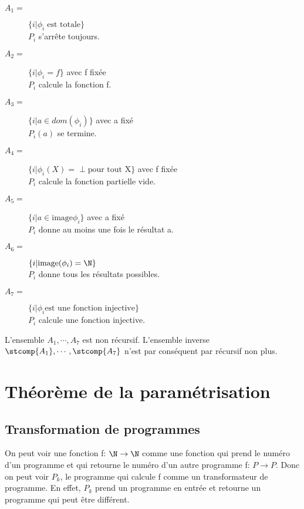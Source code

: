 \begin{description}
	\item[$A_1 =$] $\{i| \phi_i \; \text{est totale}\}$ \\
	 				$P_i$ s'arrête toujours.
	\item[$A_2 =$] $\{i| \phi_i = f\}$ avec f fixée \\
					$P_i$ calcule la fonction f.
	\item[$A_3 =$] $\{i| a \in dom(\phi_i)\}$ avec a fixé \\
					$P_i(a)$ se termine.
	\item[$A_4 =$] $\{i| \phi_i(X) = \perp \text{pour tout X}\}$ avec f fixée \\
					$P_i$ calcule la fonction partielle vide.
	\item[$A_5 =$] $\{i| a \in \text{image}\phi_i\}$ avec a fixé \\
					$P_i$ donne au moins une fois le résultat a.
	\item[$A_6 =$] $\{i| \text{image}(\phi_i) = \N\}$ \\
					$P_i$ donne tous les résultats possibles.
	\item[$A_7 =$] $\{i| \phi_i \text{est une fonction injective}\}$ \\
					$P_i$ calcule une fonction injective.
\end{description}

L'ensemble $A_1, \cdots, A_7$ est non récursif. L'ensemble inverse $\stcomp{A_1}, \cdots, \stcomp{A_7}$ n'est par conséquent par récursif non plus.


\section{Théorème de la paramétrisation}
\label{sub:th_or_me_de_la_param_trisation}

\subsection{Transformation de programmes}
\label{ssub:transformation_de_programmes}
\begin{mydef}
	On peut voir une fonction f: $\N \rightarrow \N$ comme une fonction qui prend
	le numéro d'un programme et qui retourne le numéro d'un autre programme f: $P
	\rightarrow P$. Donc on peut voir $P_k$, le programme qui calcule f comme un
	transformateur de programme. En effet, $P_k$ prend un programme en entrée et
	retourne un programme qui peut être différent.
\end{mydef}

